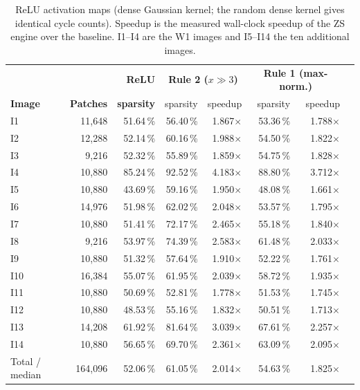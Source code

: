 \documentclass[11pt,journal,draftclsnofoot,onecolumn]{IEEEtran}
\begin{document}
\begin{table}[t]
\centering
\caption{ReLU activation maps (dense Gaussian kernel; the random dense kernel gives identical cycle counts). Speedup is the measured wall-clock speedup of the ZS engine over the baseline. I1--I4 are the W1 images and I5--I14 the ten additional images.}
\label{tab:relu}
\small
\setlength{\tabcolsep}{5pt}
\begin{tabular}{lrrrrrrr}
\toprule
 & & \textbf{ReLU} & \multicolumn{2}{c}{\textbf{Rule 2 ($x\gg3$)}} & \multicolumn{2}{c}{\textbf{Rule 1 (max-norm.)}}\\
\textbf{Image} & \textbf{Patches} & \textbf{sparsity} & sparsity & speedup & sparsity & speedup\\
\midrule
I1  & 11{,}648 & 51.64\,\% & 56.40\,\% & 1.867$\times$ & 53.36\,\% & 1.788$\times$\\
I2  & 12{,}288 & 52.14\,\% & 60.16\,\% & 1.988$\times$ & 54.50\,\% & 1.822$\times$\\
I3  &  9{,}216 & 52.32\,\% & 55.89\,\% & 1.859$\times$ & 54.75\,\% & 1.828$\times$\\
I4  & 10{,}880 & 85.24\,\% & 92.52\,\% & 4.183$\times$ & 88.80\,\% & 3.712$\times$\\
I5  & 10{,}880 & 43.69\,\% & 59.16\,\% & 1.950$\times$ & 48.08\,\% & 1.661$\times$\\
I6  & 14{,}976 & 51.98\,\% & 62.02\,\% & 2.048$\times$ & 53.57\,\% & 1.795$\times$\\
I7  & 10{,}880 & 51.41\,\% & 72.17\,\% & 2.465$\times$ & 55.18\,\% & 1.840$\times$\\
I8  &  9{,}216 & 53.97\,\% & 74.39\,\% & 2.583$\times$ & 61.48\,\% & 2.033$\times$\\
I9  & 10{,}880 & 51.32\,\% & 57.64\,\% & 1.910$\times$ & 52.22\,\% & 1.761$\times$\\
I10 & 16{,}384 & 55.07\,\% & 61.95\,\% & 2.039$\times$ & 58.72\,\% & 1.935$\times$\\
I11 & 10{,}880 & 50.69\,\% & 52.81\,\% & 1.778$\times$ & 51.53\,\% & 1.745$\times$\\
I12 & 10{,}880 & 48.53\,\% & 55.16\,\% & 1.832$\times$ & 50.51\,\% & 1.713$\times$\\
I13 & 14{,}208 & 61.92\,\% & 81.64\,\% & 3.039$\times$ & 67.61\,\% & 2.257$\times$\\
I14 & 10{,}880 & 56.65\,\% & 69.70\,\% & 2.361$\times$ & 63.09\,\% & 2.095$\times$\\
\midrule
Total / median & 164{,}096 & 52.06\,\% & 61.05\,\% & 2.014$\times$ & 54.63\,\% & 1.825$\times$\\
\bottomrule
\end{tabular}
\end{table}
\end{document}
